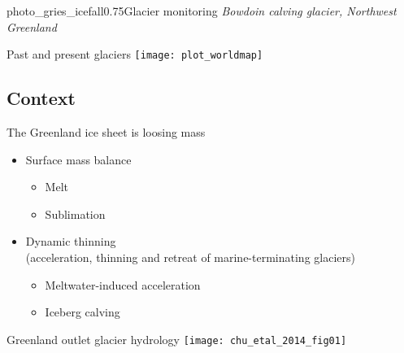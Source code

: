 
    \begin{sectionframe}{photo_gries_icefall}{0.75}{Glacier monitoring}
      \emph{Bowdoin calving glacier, Northwest Greenland}
    \end{sectionframe}

    \begin{frame}{Past and present glaciers}
      \centering
      \texttt{[image: plot\_worldmap]}
    \end{frame}

\subsection{Context}

    \begin{frame}{The Greenland ice sheet is loosing mass}
      \begin{itemize}
        \item Surface mass balance
        \begin{itemize}
          \item Melt
          \item Sublimation
        \end{itemize}
        \pause\bigskip
        \item Dynamic thinning\\
        \small{(acceleration, thinning and retreat of marine-terminating glaciers)}
        \begin{itemize}
          \item Meltwater-induced acceleration
          \item Iceberg calving
        \end{itemize}
      \end{itemize}
    \end{frame}

    \begin{frame}{Greenland outlet glacier hydrology}
      \centering
      \texttt{[image: chu\_etal\_2014\_fig01]}
    \end{frame}

